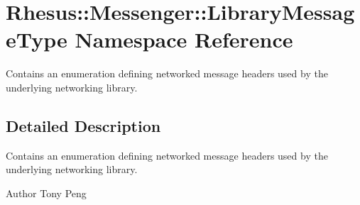 \hypertarget{namespace_rhesus_1_1_messenger_1_1_library_message_type}{\section{Rhesus\-:\-:Messenger\-:\-:Library\-Message\-Type Namespace Reference}
\label{namespace_rhesus_1_1_messenger_1_1_library_message_type}
}


Contains an enumeration defining networked message headers used by the underlying networking library.  




\subsection{Detailed Description}
Contains an enumeration defining networked message headers used by the underlying networking library. \begin{DoxyAuthor}{Author}
Tony Peng 
\end{DoxyAuthor}
